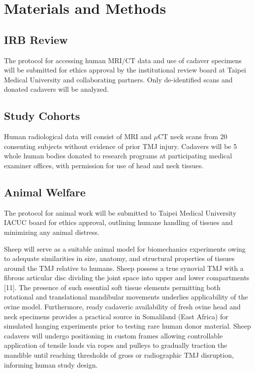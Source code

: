 \documentclass{article}
\newcommand{\tmu}{Taipei Medical University }
\begin{document}
\section{Materials and Methods}

\subsection{IRB Review}
The protocol for accessing human MRI/CT data and use of cadaver specimens will be submitted for ethics approval by the institutional review board at \tmu and collaborating partners. Only de-identified scans and donated cadavers will be analyzed.

\subsection{Study Cohorts}
Human radiological data will consist of MRI and $\mu$CT neck scans from 20 consenting subjects without evidence of prior TMJ injury.
Cadavers will be 5 whole human bodies donated to research programs at participating medical examiner offices, with permission for use of head and neck tissues.

\subsection{Animal Welfare}
The protocol for animal work will be submitted to \tmu IACUC board for ethics approval, outlining humane handling of tissues and minimizing any animal distress.

Sheep will serve as a suitable animal model for biomechanics experiments owing to adequate similarities in size, anatomy, and structural properties of tissues around the TMJ relative to humans. Sheep possess a true synovial TMJ with a fibrous articular disc dividing the joint space into upper and lower compartments [11]. The presence of such essential soft tissue elements permitting both rotational and translational mandibular movements underlies applicability of the ovine model. 
Furthermore, ready cadaveric availability of fresh ovine head and neck specimens provides a practical source in Somaliland (East Africa) for simulated hanging experiments prior to testing rare human donor material. 
Sheep cadavers will undergo positioning in custom frames allowing controllable application of tensile loads via ropes and pulleys to gradually traction the mandible until reaching thresholds of gross or radiographic TMJ disruption, informing human study design.
\end{document}
